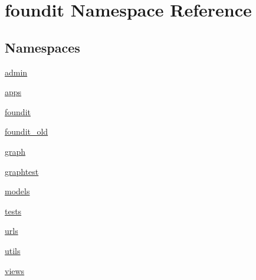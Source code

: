 \hypertarget{namespacefoundit}{}\section{foundit Namespace Reference}
\label{namespacefoundit}
\subsection*{Namespaces}
\begin{DoxyCompactItemize}
\item 
 \hyperlink{namespacefoundit_1_1admin}{admin}
\item 
 \hyperlink{namespacefoundit_1_1apps}{apps}
\item 
 \hyperlink{namespacefoundit_1_1foundit}{foundit}
\item 
 \hyperlink{namespacefoundit_1_1foundit__old}{foundit\+\_\+old}
\item 
 \hyperlink{namespacefoundit_1_1graph}{graph}
\item 
 \hyperlink{namespacefoundit_1_1graphtest}{graphtest}
\item 
 \hyperlink{namespacefoundit_1_1models}{models}
\item 
 \hyperlink{namespacefoundit_1_1tests}{tests}
\item 
 \hyperlink{namespacefoundit_1_1urls}{urls}
\item 
 \hyperlink{namespacefoundit_1_1utils}{utils}
\item 
 \hyperlink{namespacefoundit_1_1views}{views}
\end{DoxyCompactItemize}
